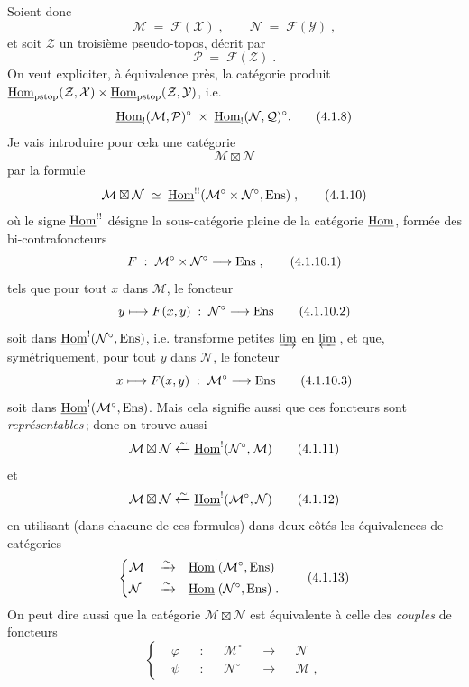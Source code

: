 Soient donc
\[
\mathcal{M} \;=\; \mathcal{F}(\mathcal{X})\;, \qquad \mathcal{N} \;=\; \mathcal{F}(\mathcal{Y})\;,
\tag*{(4.1.6)}
\]
et soit $\mathcal{Z}$ un troisième pseudo-topos, décrit par
\[
\mathcal{P} \;=\; \mathcal{F}(\mathcal{Z})\;.
\tag*{(4.1.7)}
\]
On veut expliciter, à équivalence près, la catégorie produit $\underline{\mathrm{Hom}}_{\mathrm{pstop}}(\mathcal{Z},\mathcal{X})\times\underline{\mathrm{Hom}}_{\mathrm{pstop}}(\mathcal{Z},\mathcal{Y})$, i.e.
\[
\uHom_!(\mathcal{M},\mathcal{P})^\circ \;\times\; \uHom_!(\mathcal{N},\mathcal{Q})^\circ.
\tag*{(4.1.8)}
\] %
Je vais introduire pour cela une catégorie
\[
\mathcal{M}\boxtimes\mathcal{N}
\tag*{(4.1.9)}
\]
par la formule
\[
\mathcal{M}\boxtimes\mathcal{N} \;\simeq\; \uHom^{!!}(\mathcal{M}^\circ\times\mathcal{N}^\circ,\Ens)\;,
\tag*{(4.1.10)}
\]
où le signe $\underline{\mathrm{Hom}}^{!!}$ désigne la sous-catégorie pleine de la catégorie $\underline{\mathrm{Hom}}$, formée des bi-contrafoncteurs %
\[
F \;:\; \mathcal{M}^\circ\times\mathcal{N}^\circ \longrightarrow \Ens\;,
\tag*{(4.1.10.1)}
\]
tels que pour tout $x$ dans $\mathcal{M}$, le foncteur
\[
y \longmapsto F(x,y) \;:\; \mathcal{N}^\circ \longrightarrow \Ens
\tag*{(4.1.10.2)}
\]
soit dans $\underline{\mathrm{Hom}}^!(\mathcal{N}^\circ,\mathrm{Ens})$, i.e. transforme petites $\varinjlim$ en $\varprojlim$\,, et que, symétriquement, pour tout $y$ dans $\mathcal{N}$, le foncteur
\[
x \longmapsto F(x,y) \;:\; \mathcal{M}^\circ \longrightarrow \Ens
\tag*{(4.1.10.3)}
\]
soit dans $\underline{\mathrm{Hom}}^!(\mathcal{M}^\circ,\mathrm{Ens})$. Mais cela signifie aussi que ces foncteurs sont \textit{représentables}\,; donc on trouve aussi
\[
\mathcal{M}\boxtimes\mathcal{N} \xleftarrow{\sim} \uHom^!(\mathcal{N}^\circ,\mathcal{M})
\tag*{(4.1.11)}
\]
et
\[
\mathcal{M}\boxtimes\mathcal{N} \xleftarrow{\sim} \uHom^!(\mathcal{M}^\circ,\mathcal{N})
\tag*{(4.1.12)}
\]
en utilisant (dans chacune de ces formules) dans deux côtés les équivalences de catégories
\[
\left\{
\begin{aligned}
&\mathcal{M} &&\xrightarrow{\sim} &&\uHom^!(\mathcal{M}^\circ,\Ens)\\
&\mathcal{N} &&\xrightarrow{\sim} &&\uHom^!(\mathcal{N}^\circ,\Ens)\;.
\end{aligned}
\right.
\tag*{(4.1.13)}
\]
On peut dire aussi que la catégorie $\mathcal{M}\boxtimes\mathcal{N}$ est équivalente à celle des \textit{couples} de foncteurs
\[
\left\{
\begin{aligned}
&\varphi &&: &&\mathcal{M}^\circ &&\longrightarrow &&\mathcal{N}\\
&\psi &&: &&\mathcal{N}^\circ &&\longrightarrow &&\mathcal{M}\;,
\end{aligned}
\right.
\tag*{(4.1.14)}
\]
